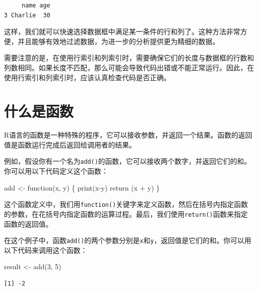 \documentclass[
  letterpaper,
  DIV=11,
  numbers=noendperiod]{scrreprt}
\newenvironment{Shaded}{\begin{snugshade}}{\end{snugshade}}
\newcommand{\ControlFlowTok}[1]{\textcolor[rgb]{0.00,0.23,0.31}{#1}}
\newcommand{\DecValTok}[1]{\textcolor[rgb]{0.68,0.00,0.00}{#1}}
\newcommand{\FunctionTok}[1]{\textcolor[rgb]{0.28,0.35,0.67}{#1}}
\newcommand{\NormalTok}[1]{\textcolor[rgb]{0.00,0.23,0.31}{#1}}
\newcommand{\OtherTok}[1]{\textcolor[rgb]{0.00,0.23,0.31}{#1}}
\newcommand{\SpecialCharTok}[1]{\textcolor[rgb]{0.37,0.37,0.37}{#1}}
\begin{document}
\begin{verbatim}
     name age
3 Charlie  30
\end{verbatim}

这样，我们就可以快速选择数据框中满足某一条件的行和列了。这种方法非常方便，并且能够有效地过滤数据，为进一步的分析提供更为精细的数据。

需要注意的是，在使用行索引和列索引时，需要确保它们的长度与数据框的行数和列数相同。如果长度不匹配，那么可能会导致代码出错或不能正常运行。因此，在使用行索引和列索引时，应该认真检查代码是否正确。

\hypertarget{ux4ec0ux4e48ux662fux51fdux6570}{%
\chapter{什么是函数}\label{ux4ec0ux4e48ux662fux51fdux6570}}

R语言的函数是一种特殊的程序，它可以接收参数，并返回一个结果。函数的返回值是函数运行完成后返回给调用者的结果。

例如，假设你有一个名为\texttt{add()}的函数，它可以接收两个数字，并返回它们的和。你可以用以下代码定义这个函数：

\begin{Shaded}
\begin{Highlighting}[]
\NormalTok{add }\OtherTok{\textless{}{-}} \ControlFlowTok{function}\NormalTok{(x, y) \{}
  \FunctionTok{print}\NormalTok{(x}\SpecialCharTok{{-}}\NormalTok{y)}
  \FunctionTok{return}\NormalTok{ (x }\SpecialCharTok{+}\NormalTok{ y)}
\NormalTok{\}}
\end{Highlighting}
\end{Shaded}

这个函数定义中，我们用\texttt{function()}关键字来定义函数，然后在括号内指定函数的参数，在花括号内指定函数的运算过程。最后，我们使用\texttt{return()}函数来指定函数的返回值。

在这个例子中，函数\texttt{add()}的两个参数分别是\texttt{x}和\texttt{y}，返回值是它们的和。你可以用以下代码来调用这个函数：

\begin{Shaded}
\begin{Highlighting}[]
\NormalTok{result }\OtherTok{\textless{}{-}} \FunctionTok{add}\NormalTok{(}\DecValTok{3}\NormalTok{, }\DecValTok{5}\NormalTok{)}
\end{Highlighting}
\end{Shaded}

\begin{verbatim}
[1] -2
\end{verbatim}
\end{document}
